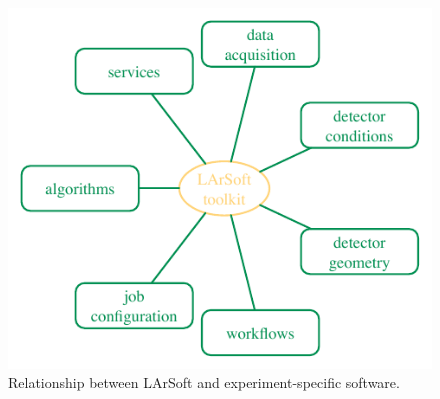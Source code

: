 \begin{figure}
   \centering\includegraphics{figures/LArSoftExperimentSoftware}
   \caption{\label{fig:LArSoftRelations:Experiments}
      Relationship between LArSoft and experiment-specific software.
   }
\end{figure}

